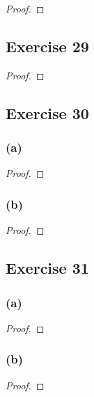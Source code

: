 \documentclass[14pt]{extarticle}
\begin{document}
\begin{proof}

\end{proof}

\subsection{Exercise 29}

\begin{proof}

\end{proof}

\subsection{Exercise 30}

\subsubsection{(a)}

\begin{proof}

\end{proof}

\subsubsection{(b)}

\begin{proof}

\end{proof}

\subsection{Exercise 31}

\subsubsection{(a)}

\begin{proof}

\end{proof}

\subsubsection{(b)}

\begin{proof}

\end{proof}
\end{document}

